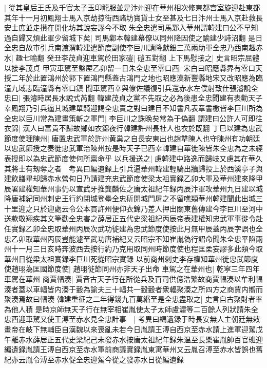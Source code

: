 |{
	從其皇后王氏及千官太子玉印龍服並是汴州迎在華州相次修東都宫室旋迎赴東都其年十一月初鳳翔士馬入京劫掠街西諸坊寶貨士女至甚及七日汴州士馬入京赴救長安士庶並走攅在開化坊其說妄謬今不取}
朱全忠遣司馬鄴入華州謂韓建曰公不早知過自歸又煩此軍少留城下矣|{
	司馬鄴本韓建幕僚以同州降因使之諭建少詩沼翻}
是日全忠自故市引兵南渡渭韓建遣節度副使李巨川請降獻銀三萬兩助軍全忠乃西南趣赤水|{
	趣七喻翻}
癸丑李茂貞迎車駕於田家磑|{
	磑五對翻}
上下馬慰接之|{
	史言昭宗屈體以接李茂貞}
甲寅車駕至盩厔乙卯留一日朱全忠至零口西|{
	宋白曰昭應縣界有零口天授二年於此置鴻州於郭下置鴻門縣蓋古鴻門之地也昭應漢新豐縣地宋又改昭應為臨潼九域志臨潼縣有零口鎮}
聞車駕西幸與僚佐議復引兵還赤水左僕射致仕張濬說全忠曰|{
	張濬時居長水說式芮翻}
韓建茂貞之黨不先取之必為後患全忠聞建有表勸天子幸鳳翔乃引兵逼其城建單騎迎謁全忠責之對曰建目不知書凡表章書檄皆李巨川所為全忠以巨川常為建畫策斬之軍門|{
	李巨川之誅晚矣常為于偽翻}
謂建曰公許人可即往衣錦|{
	漢人曰富貴不歸故鄉如衣錦夜行韓建許州長社人也衣於既翻}
丁巳以建為忠武節度使理陳州|{
	唐置忠武軍於許州黄巢之自長安東出也趙犨陳人也守陳州有功朝廷以忠武節授之奏徙忠武軍治陳州按是時天子已西幸韓建自華徙陳皆朱全忠為之未經表授即以為忠武節度使何所禀命乎}
以兵援送之|{
	慮韓建中路逸而歸岐又慮其在華久其將士有刼奪之者　考異曰編遺録上引兵逼華州韓建輕騎出牆歸投上於西溪亭子與建飲膳畢却歸赤水營旬日乃請建充忠武節度使梁太祖實録乙卯大軍及華州建來降甲辰署建權知華州事仍以宣武牙推龔麟佐之唐太祖紀年録丙辰汴軍攻華州九日建以城降唐補紀同州刺史王行約閉城登壘全忠斫開城門屠之不留噍類華州韓建聞此出城三十里迎之只於迎處云令公本貫許州便仰衣錦乃差人押出關東舊傳建今李巨川至河中送款敬翔疾其文筆勸全忠害之薛居正五代史梁祖紀丙辰帝表建權知忠武軍事徙令赴任實録乙卯全忠取華州丙辰次武功徙建為忠武節度使按此月無甲辰蓋丙辰字誤也全忠乙卯取華州丙辰豈能遽至武功唐補紀又云昭宗不知崔胤偽行詔命聞朱全忠平陷兩州十一月三日亥時奔波西去按行約乃克用取同州時節度使也程匡柔妄謬多此類今取華州日從梁太祖實録李巨川死從昭宗實録}
以前商州刺史李存權知華州徙忠武節度使趙珝為匡國節度使|{
	趙珝徙節同州亦非天子出命}
車駕之在華州也|{
	乾寧三年四年車駕在華州}
商賈輻湊|{
	賈音古天子行在所從兵及百司供億浩繁故商賈輻湊以牟利輻湊者蓋以車輻皆内湊于轂為諭夫三十輻共一轂轂者衆輻聚湊之所四方之商賈内嚮而聚湊焉故曰輻湊}
韓建重征之二年得錢九百萬緡至是全忠盡取之|{
	史言自古聚財者率為他人積}
是時京師無天子行在無宰相崔胤使太子太師盧渥等二百餘人列狀請朱全忠西迎車駕又使王溥至赤水見全忠計事　|{
	考異曰編遺録于時長安無人主朝廷無敕畫帝在岐下無輔臣自漢魏以來喪亂未若今日胤請王溥自西京至赤水請上進軍迎駕戊午離赤水薛居正五代史梁紀己未發赤水按唐太祖紀年録朱温至長樂崔胤帥百官班迎編遺録胤請王溥自西京至赤水軍前商議實録胤東寓華州又云胤召溥至赤水皆誤也舊紀亦云胤令溥至赤水促全忠迎駕今從之發赤水日從編遺録}
